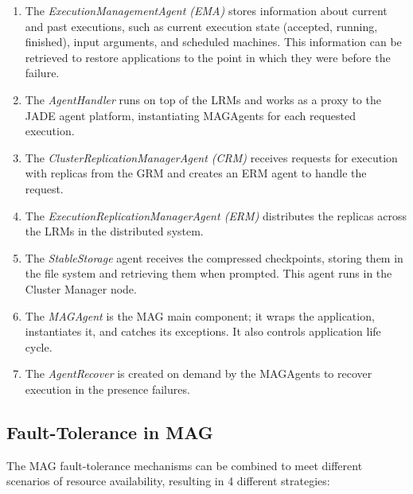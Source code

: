 \documentclass{cpeauth}
\begin{document}
\begin{enumerate}

    \item The \emph{ExecutionManagementAgent (EMA)}  stores
    information about current and past executions, such as current execution state
    (accepted, running, finished), input arguments, and scheduled machines. This information
    can be retrieved to restore applications to the point in which they were before
    the failure.

    \item The \emph{AgentHandler} runs on top of the LRMs and 
    works as a proxy to the JADE agent platform, instantiating
    MAGAgents for each requested execution.

    \item The \emph{ClusterReplicationManagerAgent (CRM)} receives requests
    for execution with replicas from the GRM and creates an ERM agent to handle the request.

    \item The \emph{ExecutionReplicationManagerAgent (ERM)} distributes the replicas across the 
    LRMs in the distributed system.

    \item The \emph{StableStorage} agent receives the compressed
    checkpoints, storing them in the file system and retrieving them when
    prompted. This agent runs in the Cluster Manager node.

    \item The \emph{MAGAgent} is the MAG main component; it
    wraps the application, instantiates it, and catches its exceptions. It also controls application 
    life cycle.

    \item The \emph{AgentRecover} is created on demand by the MAGAgents  to recover
    execution in the presence failures.

\end{enumerate}

\subsection{Fault-Tolerance in MAG\label{sec:faulttolerance}}

The MAG fault-tolerance mechanisms can be combined to meet different scenarios of resource
availability, resulting in 4 different strategies:
\end{document}
